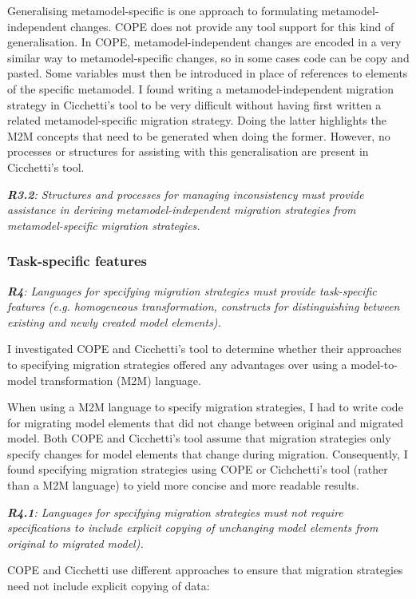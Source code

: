 \documentclass[a4paper]{article}
\begin{document}
Generalising metamodel-specific is one approach to formulating metamodel-independent changes. COPE does not provide any tool support for this kind of  generalisation. In COPE, metamodel-independent changes are encoded in a very similar way to metamodel-specific changes, so in some cases code can be copy and pasted. Some variables must then be introduced in place of references to elements of the specific metamodel. I found writing a metamodel-independent migration strategy in Cicchetti's tool to be very difficult without having first written a related metamodel-specific migration strategy. Doing the latter highlights the M2M concepts that need to be generated when doing the former. However, no processes or structures for assisting with this generalisation are present in Cicchetti's tool.

\emph{\textbf{R3.2}: Structures and processes for managing inconsistency must provide assistance in deriving metamodel-independent migration strategies from metamodel-specific migration strategies.}


\subsubsection{Task-specific features}

\emph{\textbf{R4}: Languages for specifying migration strategies must provide task-specific features (e.g. homogeneous transformation, constructs for distinguishing between existing and newly created model elements).}

I investigated COPE and Cicchetti's tool to determine whether their approaches to specifying migration strategies offered any advantages over using a model-to-model transformation (M2M) language.

When using a M2M language to specify migration strategies, I had to write code for migrating model elements that did not change between original and migrated model. Both COPE and Cicchetti's tool assume that migration strategies only specify changes for model elements that change during migration. Consequently, I found specifying migration strategies using COPE or Cichchetti's tool (rather than a M2M language) to yield more concise and more readable results.

\emph{\textbf{R4.1}: Languages for specifying migration strategies must not require specifications to include explicit copying of unchanging model elements from original to migrated model).}

COPE and Cicchetti use different approaches to ensure that migration strategies need not include explicit copying of data:
\end{document}
